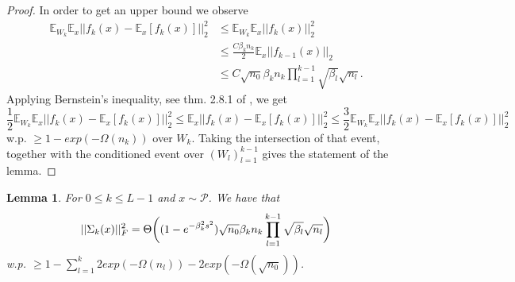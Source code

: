 \documentclass{article}
\theoremstyle{plain}
\newtheorem{lemma}[Theorem]{Lemma}
\theoremstyle{definition}
\theoremstyle{remark}
\begin{document}
\begin{proof}
In order to get an upper bound we observe
\begin{align*}
	\mathbb{E}_{W_k}\mathbb{E}_x\vert\vert f_k(x) - 
	\mathbb{E}_x[f_k(x)]\vert\vert^2_2 &\leq 
	\mathbb{E}_{W_k}\mathbb{E}_x\vert\vert f_k(x)\vert\vert_2^2 \\
	&\leq 
	\frac{C\beta_kn_k}{2}\mathbb{E}_x\vert\vert f_{k-1}(x)\vert\vert_2 \\
	&\leq C\sqrt{n_0}\beta_kn_k\prod_{l=1}^{k-1}\sqrt{\beta_l}\sqrt{n_l}.
\end{align*}
Applying Bernstein's inequality, see thm. 2.8.1 of \cite{vershynin2018high}, we get
\begin{equation*}
\frac{1}{2}\mathbb{E}_{W_k}\mathbb{E}_x\vert\vert f_k(x) - 
	\mathbb{E}_x[f_k(x)]\vert\vert^2_2 \leq 
	\mathbb{E}_x\vert\vert f_k(x) - 
	\mathbb{E}_x[f_k(x)]\vert\vert^2_2 \leq 
	\frac{3}{2}\mathbb{E}_{W_k}\mathbb{E}_x\vert\vert f_k(x) - 
	\mathbb{E}_x[f_k(x)]\vert\vert^2_2
\end{equation*}
w.p. $\geq 1 - exp(-\Omega(n_k))$ over $W_k$. Taking the intersection of that event, together with the conditioned event over $(W_l)_{l=1}^{k-1}$ gives the statement of the lemma.
\end{proof}


\begin{lemma}\label{c5}
For $0\leq k \leq L-1$ and $x \sim \mathcal{P}$. 
We have that 
\begin{equation*}
	\vert\vert\Sigma_k(x)\vert\vert_F^2 = \Theta\bigg{(} 
	(1- e^{-\beta_k^2s^2})\sqrt{n_0}\beta_kn_k\prod_{l=1}^{k-1}\sqrt{\beta_l}
	\sqrt{n_l}
	\bigg{)}
\end{equation*}
w.p. $\geq 1 - \sum_{l=1}^k2exp(-\Omega(n_l)) - 2exp(-\Omega(\sqrt{n_0}))$.
\end{lemma}
\end{document}
